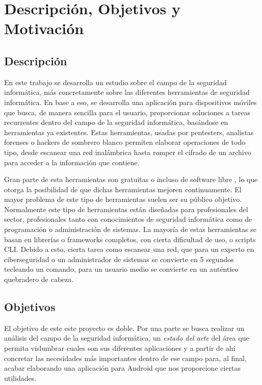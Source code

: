\chapter{Descripción, Objetivos y Motivación}

\section{Descripción}

En este trabajo se desarrolla un estudio sobre el campo de la seguridad informática, más concretamente sobre las diferentes herramientas de seguridad informática. En base a eso, se desarrolla una aplicación para dispositivos móviles que busca, de manera sencilla para el usuario, proporcionar soluciones a tareas recurrentes dentro del campo de la seguridad informática, basándose en herramientas ya existentes. Estas herramientas, usadas por pentesters, analistas forenses o hackers de sombrero blanco permiten elaborar operaciones de todo tipo, desde escanear una red inalámbrica hasta romper el cifrado de un archivo para acceder a la información que contiene.

Gran parte de esta herramientas son gratuitas \cite{ofi-seg-inter} o incluso de software libre \cite{github-sec-showcase}, lo que otorga la posibilidad de que dichas herramientas mejoren continuamente. El mayor problema de este tipo de herramientas suelen ser su público objetivo. Normalmente este tipo de herramientas están diseñadas para profesionales del sector, profesionales tanto con conocimientos de seguridad informática como de programación o administración de sistemas. La mayoría de estas herramientas se basan en librerías o frameworks completos, con cierta dificultad de uso, o scripts CLI. Debido a esto, cierta tarea como escanear una red, que para un experto en ciberseguridad o un administrador de sistemas se convierte en 5 segundos tecleando un comando, para un usuario medio se convierte en un auténtico quebradero de cabeza.

\section{Objetivos}

El objetivo de este este proyecto es doble. Por una parte se busca realizar un análisis del campo de la seguridad informática, un \textit{estado del arte} del área que permita vislumbrar cuales son sus diferentes aplicaciones y a partir de ahí concretar las necesidades más importantes dentro de ese campo para, al final, acabar elaborando una aplicación para Android que nos proporcione ciertas utilidades.

